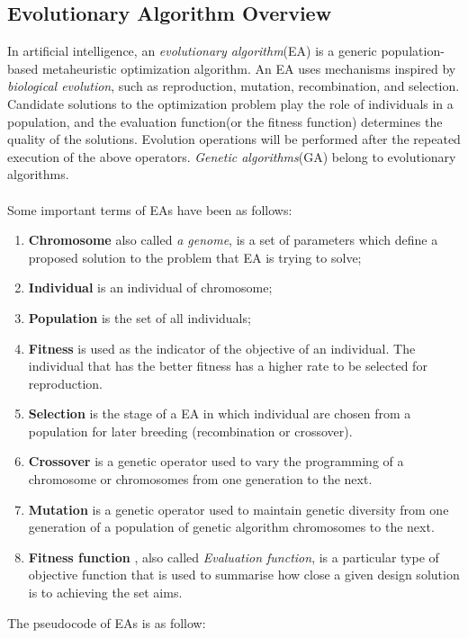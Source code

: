 \documentclass[a4paper, 11pt]{article}
\begin{document}
\subsection{Evolutionary Algorithm Overview}
In artificial intelligence, an \emph{evolutionary algorithm}(EA) is a generic population-based metaheuristic optimization algorithm.
An EA uses mechanisms inspired by \emph{biological evolution}, such as reproduction, mutation, recombination, and selection.
Candidate solutions to the optimization problem play the role of individuals in a population, and the evaluation function(or the fitness function)
determines the quality of the solutions. Evolution operations will be performed after the repeated execution of the above operators.
\emph{Genetic algorithms}(GA) belong to evolutionary algorithms.\\
\\
Some important terms of EAs have been as follows:
\begin{enumerate}[~~]
\item \textbf{Chromosome} also called \emph{a genome}, is a set of parameters which define a proposed solution to the problem
that EA is trying to solve;
\item \textbf{Individual} is an individual of chromosome;
\item \textbf{Population} is the set of all individuals;
\item \textbf{Fitness} is used as the indicator of the objective of an individual. The individual that has the better fitness has a higher rate to be selected for reproduction.
\item \textbf{Selection} is the stage of a EA in which individual are chosen from a population for later breeding (recombination or crossover).
\item \textbf{Crossover} is a genetic operator used to vary the programming of a chromosome or chromosomes from one generation to the next.
\item \textbf{Mutation} is a genetic operator used to maintain genetic diversity from one generation of a population of genetic algorithm chromosomes to the next.
\item \textbf{Fitness function} , also called \emph{Evaluation function}, is a particular type of objective function that is used to summarise how close a given design solution is to achieving the set aims.\\
\end{enumerate}
The pseudocode of EAs is as follow:
\end{document}
